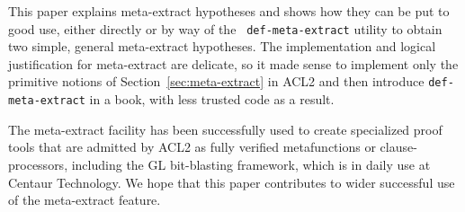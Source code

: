 







This paper explains meta-extract hypotheses and shows how they can be
put to good use, either directly or by way of the {\tt
def-meta-extract} utility to obtain two simple, general meta-extract
hypotheses.  The implementation and logical justification for
meta-extract are delicate, so it made sense to implement only the
primitive notions of Section~\ref{sec:meta-extract} in ACL2 and then
introduce {\tt def-meta-extract} in a book, with less trusted code as
a result.

The meta-extract facility has been successfully used to create
specialized proof tools that are admitted by ACL2 as fully verified
metafunctions or clause-processors, including the GL bit-blasting
framework, which is in daily use at Centaur Technology.  We hope that
this paper contributes to wider successful use of the meta-extract
feature.
